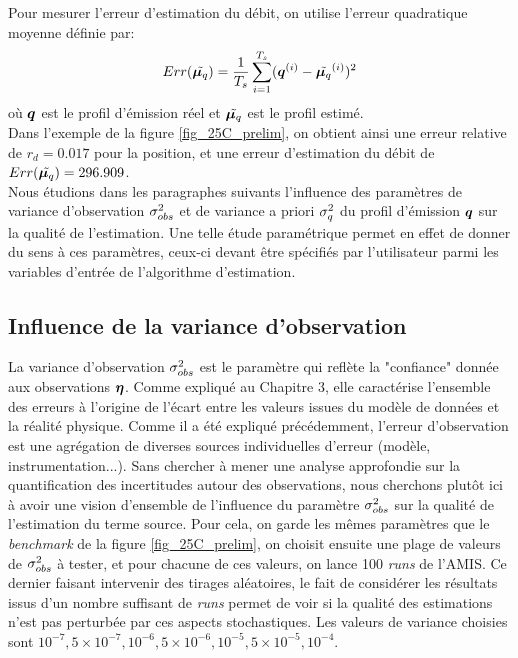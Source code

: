 Pour mesurer l'erreur d'estimation du débit, on utilise l'erreur quadratique moyenne définie par:
 \begin{equation}
	 Err(\tilde{{\bm{\mu}_q}}) = \dfrac{1}{T_s} \sum\limits_{i=1}^{T_s}({\bm{q}}^{(i)} - \tilde{{\bm{\mu}_q}}^{(i)})^2
 \end{equation}
 où ${\bm{q}}$ est le profil d'émission réel et $\tilde{{\bm{\mu}_q}}$ est le profil estimé.\\
 
 Dans l'exemple de la figure \ref{fig_25C_prelim}, on obtient ainsi une erreur relative de $r_d = 0.017$ pour la position, et une erreur d'estimation du débit de $Err(\tilde{{\bm{\mu}_q}}) = 296.909$. \\
 
 Nous étudions dans les paragraphes suivants l'influence des paramètres de variance d'observation ${\sigma_{obs}^2}$ et de variance a priori $\sigma_q^2$ du profil d'émission ${\bm{q}}$ sur la qualité de l'estimation. Une telle étude paramétrique permet en effet de donner du sens à ces paramètres, ceux-ci devant être spécifiés par l'utilisateur parmi les variables d'entrée de l'algorithme d'estimation. 
 
 \subsection{Influence de la variance d'observation}
 
 La variance d'observation ${\sigma_{obs}^2}$ est le paramètre qui reflète la "confiance" donnée aux observations ${\bm{\eta}}$. Comme expliqué au Chapitre 3, elle caractérise l'ensemble des erreurs à l'origine de l'écart entre les valeurs issues du modèle de données et la réalité physique. Comme il a été expliqué précédemment, l'erreur d'observation est une agrégation de diverses sources individuelles d'erreur (modèle, instrumentation...). Sans chercher à mener une analyse approfondie sur la quantification des incertitudes autour des observations, nous cherchons plutôt ici à avoir une vision d'ensemble de l'influence du paramètre ${\sigma_{obs}^2}$ sur la qualité de l'estimation du terme source. Pour cela, on garde les mêmes paramètres que le \textit{benchmark} de la figure \ref{fig_25C_prelim}, on choisit ensuite une plage de valeurs de ${\sigma_{obs}^2}$ à tester, et pour chacune de ces valeurs, on lance 100 \textit{runs} de l'AMIS. Ce dernier faisant intervenir des tirages aléatoires, le fait de considérer les résultats issus d'un nombre suffisant de \textit{runs} permet de voir si la qualité des estimations n'est pas perturbée par ces aspects stochastiques. Les valeurs de variance choisies sont $10^{-7}, 5\times 10^{-7}, 10^{-6}, 5\times 10^{-6}, 10^{-5}, 5\times 10^{-5},10^{-4}$. \\
   
